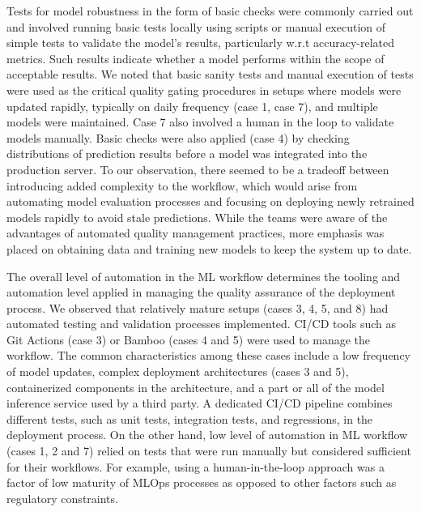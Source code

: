 Tests for model robustness in the form of basic checks were commonly carried out and involved running basic tests locally using scripts or manual execution of simple tests to validate the model's results, particularly w.r.t accuracy-related metrics. Such results indicate whether a model performs within the scope of acceptable results. We noted that basic sanity tests and manual execution of tests were used as the critical quality gating procedures in setups where models were updated rapidly, typically on daily frequency (case 1, case 7), and multiple models were maintained. Case 7 also involved a human in the loop to validate models manually. Basic checks were also applied (case 4) by checking distributions of prediction results before a model was integrated into the production server. To our observation, there seemed to be a tradeoff between introducing added complexity to the workflow, which would arise from automating model evaluation processes and focusing on deploying newly retrained models rapidly to avoid stale predictions. While the teams were aware of the advantages of automated quality management practices, more emphasis was placed on obtaining data and training new models to keep the system up to date. %

The overall level of automation in the ML workflow determines the tooling and automation level applied in managing the quality assurance of the deployment process. We observed that relatively mature setups (cases 3, 4, 5, and 8) had automated testing and validation processes implemented. CI/CD tools such as Git Actions (case 3) or Bamboo (cases 4 and 5) were used to manage the workflow. The common characteristics among these cases include a low frequency of model updates, complex deployment architectures (cases 3 and 5), containerized components in the architecture, and a part or all of the model inference service used by a third party. A dedicated CI/CD pipeline combines different tests, such as unit tests, integration tests, and regressions, in the deployment process. On the other hand, low level of automation in ML workflow %
(cases 1, 2 and 7) relied on tests that were run manually but considered sufficient for their workflows. For example, using a human-in-the-loop approach was a factor of low maturity of MLOps processes as opposed to other factors such as regulatory constraints.

